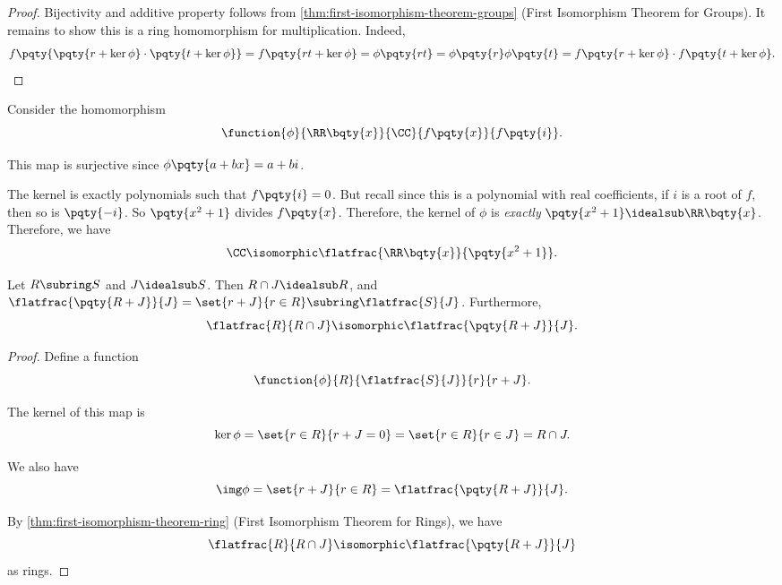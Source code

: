 \begin{proof}
    Bijectivity and additive property follows from \autoref{thm:first-isomorphism-theorem-groups} (First Isomorphism Theorem for Groups). It remains to show this is a ring homomorphism for multiplication. Indeed,
    \[
        f\pqty{\pqty{r + \ker \phi} \cdot \pqty{t + \ker \phi}} = f \pqty{rt + \ker \phi} = \phi \pqty{rt} = \phi\pqty{r} \phi\pqty{t} = f\pqty{r + \ker \phi} \cdot f\pqty{t + \ker \phi}.
    \]
\end{proof}

\begin{example}
    Consider the homomorphism
    \[
        \function{\phi}{\RR\bqty{x}}{\CC}{f\pqty{x}}{f\pqty{i}}.
    \]

    This map is surjective since \(\phi\pqty{a + bx} = a + bi\). 
    
    The kernel is exactly polynomials such that \(f\pqty{i} = 0\). But recall since this is a polynomial with real coefficients, if \(i\) is a root of \(f\), then so is \(\pqty{-i}\). So \(\pqty{x^2 + 1}\) divides \(f\pqty{x}\). Therefore, the kernel of \(\phi\) is \emph{exactly} \(\pqty{x^2 + 1} \idealsub \RR\bqty{x}\). Therefore, we have
    \[
        \CC \isomorphic \flatfrac{\RR\bqty{x}}{\pqty{x^2 + 1}}.
    \]
\end{example}

\begin{theorem}
    \label{thm:second-isomorphism-theorem-ring}%
    Let \(R \subring S\) and \(J \idealsub S\). Then \(R \cap J \idealsub R\), and \(\flatfrac{\pqty{R + J}}{J} = \set{r + J}{r \in R} \subring \flatfrac{S}{J}\). Furthermore,
    \[
        \flatfrac{R}{R \cap J} \isomorphic \flatfrac{\pqty{R + J}}{J}.
    \]
\end{theorem}

\begin{proof}
    Define a function
    \[
        \function{\phi}{R}{\flatfrac{S}{J}}{r}{r + J}.
    \]

    The kernel of this map is
    \[
        \ker \phi = \set{r \in R}{r + J = 0} = \set{r \in R}{r \in J} = R \cap J.
    \]

    We also have
    \[
        \img \phi = \set{r + J}{r \in R} = \flatfrac{\pqty{R + J}}{J}.
    \]

    By \autoref{thm:first-isomorphism-theorem-ring} (First Isomorphism Theorem for Rings), we have
    \[
        \flatfrac{R}{R \cap J} \isomorphic \flatfrac{\pqty{R + J}}{J}
    \]
    as rings.
\end{proof}

